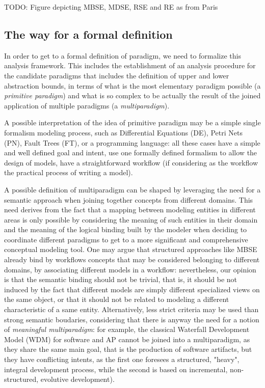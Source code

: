 TODO: Figure depicting MBSE, MDSE, RSE and RE as from Paris

\subsection{The way for a formal definition}

In order to get to a formal definition of paradigm, we need to formalize this analysis framework. This includes the establishment of an analysis procedure for the candidate paradigms that includes the definition of upper and lower abstraction bounds, in terms of what is the most elementary paradigm possible (a \textit{primitive paradigm}) and what is so complex to be actually the result of the joined application of multiple paradigms (a \textit{multiparadigm}).

A possible interpretation of the idea of primitive paradigm may be a simple single formalism modeling process, such as Differential Equations (DE), Petri Nets (PN), Fault Trees (FT), or a programming language: all these cases have a simple and well defined goal and intent, use one formally defined formalism to allow the design of models, have a straightforward workflow (if considering as the workflow the practical process of writing a model).

A possible definition of multiparadigm can be shaped by leveraging the need for a semantic approach when joining together concepts from different domains. This need derives from the fact that a mapping between modeling entities in different areas is only possible by considering the meaning of such entities in their domain and the meaning of the logical binding built by the modeler when deciding to coordinate different paradigms to get to a more significant and comprehensive conceptual modeling tool. One may argue that structured approaches like MBSE already bind by workflows concepts that may be considered belonging to different domains, by associating different models in a workflow: nevertheless, our opinion is that the semantic binding should not be trivial, that is, it should be not induced by the fact that different models are simply different specialized views on the same object, or that it should not be related to modeling a different characteristic of a same entity. Alternatively, less strict criteria may be used than strong semantic boudaries, considering that there is anyway the need for a notion of \textit{meaningful multiparadigm}: for example, the classical Waterfall Development Model (WDM) for software and AP cannot be joined into a multiparadigm, as they share the same main goal, that is the production of software artifacts, but they have conflicting intents, as the first one foresees a structured, "heavy", integral development process, while the second is based on incremental, non-structured, evolutive development).

